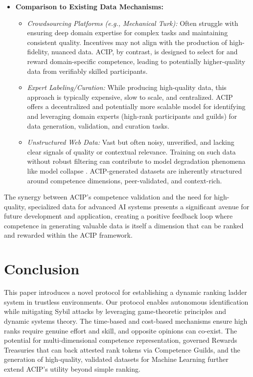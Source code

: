 \documentclass{article}
\begin{document}
\begin{CJK}{UTF8}{gbsn}
\begin{itemize}
        \item \textbf{Comparison to Existing Data Mechanisms:}
              \begin{itemize}[label=\textbullet, leftmargin=*]
                  \item \textit{Crowdsourcing Platforms (e.g., Mechanical Turk):} Often struggle with ensuring deep domain expertise for complex tasks and maintaining consistent quality. Incentives may not align with the production of high-fidelity, nuanced data. ACIP, by contrast, is designed to select for and reward domain-specific competence, leading to potentially higher-quality data from verifiably skilled participants.
                  \item \textit{Expert Labeling/Curation:} While producing high-quality data, this approach is typically expensive, slow to scale, and centralized. ACIP offers a decentralized and potentially more scalable model for identifying and leveraging domain experts (high-rank participants and guilds) for data generation, validation, and curation tasks.
                  \item \textit{Unstructured Web Data:} Vast but often noisy, unverified, and lacking clear signals of quality or contextual relevance. {{Training on such data without robust filtering can contribute to model degradation phenomena like model collapse \cite{dohmatob2024strongmodelcollapse}.}} ACIP-generated datasets are inherently structured around competence dimensions, peer-validated, and context-rich.
              \end{itemize}
    \end{itemize}
    The synergy between ACIP's competence validation and the need for high-quality, specialized data for advanced AI systems presents a significant avenue for future development and application, creating a positive feedback loop where competence in generating valuable data is itself a dimension that can be ranked and rewarded within the ACIP framework.

    \section{Conclusion}
    This paper introduces a novel protocol for establishing a dynamic ranking ladder system in trustless environments. Our protocol enables autonomous identification while mitigating Sybil attacks by leveraging game-theoretic principles and dynamic systems theory. The time-based and cost-based mechanisms ensure high ranks require genuine effort and skill, and opposite opinions can co-exist. {{The potential for multi-dimensional competence representation, governed Rewards Treasuries that can back attested rank tokens via Competence Guilds, and the generation of high-quality, validated datasets for Machine Learning further extend ACIP's utility beyond simple ranking.}}


\end{CJK}
\end{document}
